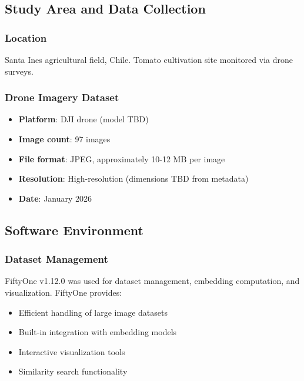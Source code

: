 
\subsection{Study Area and Data Collection}

\subsubsection{Location}
Santa Ines agricultural field, Chile. Tomato cultivation site monitored via drone surveys.


\subsubsection{Drone Imagery Dataset}
\begin{itemize}
    \item \textbf{Platform}: DJI drone (model TBD)
    \item \textbf{Image count}: 97 images
    \item \textbf{File format}: JPEG, approximately 10-12 MB per image
    \item \textbf{Resolution}: High-resolution (dimensions TBD from metadata)
    \item \textbf{Date}: January 2026
\end{itemize}

\subsection{Software Environment}

\subsubsection{Dataset Management}
FiftyOne v1.12.0 \citep{fiftyone} was used for dataset management, embedding computation, and visualization. FiftyOne provides:
\begin{itemize}
    \item Efficient handling of large image datasets
    \item Built-in integration with embedding models
    \item Interactive visualization tools
    \item Similarity search functionality
\end{itemize}

